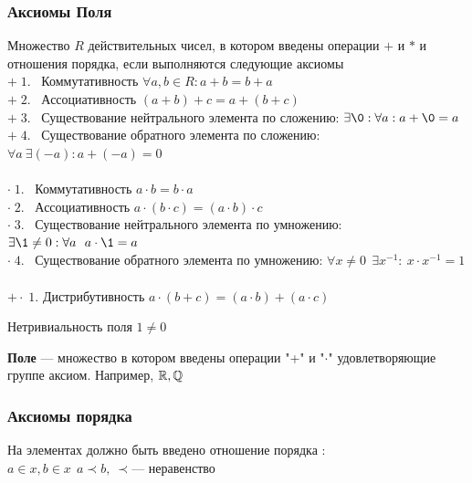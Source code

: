 \subsubsection*{ Аксиомы Поля}
Множество $R$ действительных чисел, в котором введены операции $+$ и $*$ и отношения порядка, если выполняются следующие аксиомы
        \\ $ +\;1.$ \ Коммутативность $ \forall a,b \in R : a + b = b + a $
		\\ $ +\;2. $ \ Ассоциативность $ (a+b)+c = a + (b + c) $
		\\ $ +\;3. $ \ Существование нейтрального элемента по сложению: $ \exists \0 : \forall a : a + \0 = a $
		\\ $ +\;4. $ \ Существование обратного элемента по сложению: $ \forall a \ \exists  (-a) : a + (-a) = 0 $
		\\
		\\ $ \cdot \; 1. $ \ Коммутативность $ a \cdot b = b\cdot a $
		\\ $ \cdot \; 2. $ \ Ассоциативность $ a\cdot (b \cdot c) = (a \cdot b) \cdot c $
		\\ $ \cdot \; 3. $ \ Существование нейтрального элемента по умножению: $ \exists \1 \neq 0 : \forall a \ \ a \cdot \1 = a $
		\\ $ \cdot \; 4. $ \ Существование обратного элемента по умножению: $ \forall x \neq 0 \ \ \exists  x^{-1} : \ x \cdot x^{-1} = 1  $
		\\
		\\ $ +\cdot \; 1. $ Дистрибутивность $ a \cdot (b+c) = (a\cdot b) + (a\cdot c) $
		\\
		\begin{remark}
		    Нетривиальность поля $1 \neq 0$
		\end{remark}
		\begin{definition}
		    \textbf{Поле} --- множество в котором введены операции "+" и "$\cdot$" удовлетворяющие  группе аксиом. Например, $\operatorname*{\mathbb{R}}, \operatorname*{\mathbb{Q}}$
	    \end{definition}
	\subsubsection*{ Аксиомы порядка}
	
  	\begin{remark}
  		На элементах должно быть введено отношение порядка : $ a \in x, b \in x \ \ a \prec b, \ \prec  \text{--- неравенство} $
  	\end{remark}
   	
